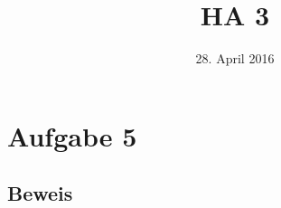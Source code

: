 



\title{HA 3}
\date{28. April 2016}

\maketitle

\section*{Aufgabe 5}
\label{sec:Aufgabe 5}

\subsection{Beweis}
\label{sub:Beweis}

